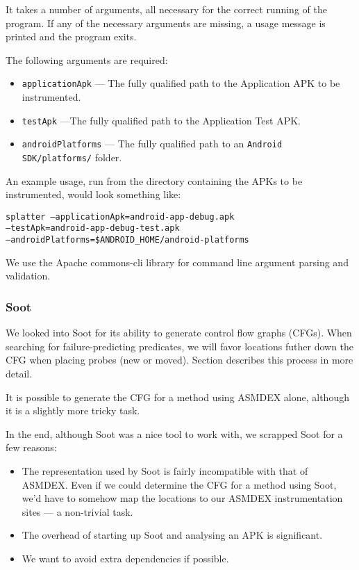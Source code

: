 It takes a number of arguments, all necessary for the correct running of the program. If any of the necessary arguments are missing, a usage message is printed and the program exits.

The following arguments are required:
\begin{itemize}
    \item \texttt{applicationApk} --- The fully qualified path to the Application APK to be instrumented.
    \item \texttt{testApk} ---The fully qualified path to the Application Test APK.
    \item \texttt{androidPlatforms} --- The fully qualified path to an \texttt{Android SDK/platforms/} folder.
\end{itemize}

An example usage, run from the directory containing the APKs to be instrumented, would look something like:

\texttt{splatter --applicationApk=android-app-debug.apk\\--testApk=android-app-debug-test.apk\\--androidPlatforms=\$ANDROID\_HOME/android-platforms}

We use the Apache commons-cli library for command line argument parsing and validation.

\subsubsection{Soot}

We looked into Soot for its ability to generate control flow graphs (CFGs). When searching for failure-predicting predicates, we will favor locations futher down the CFG when placing probes (new or moved). Section  describes this process in more detail.

It is possible to generate the CFG for a method using ASMDEX alone, although it is a slightly more tricky task.

In the end, although Soot was a nice tool to work with, we scrapped Soot for a few reasons:
\begin{itemize}
    \item The representation used by Soot is fairly incompatible with that of ASMDEX. Even if we could determine the CFG for a method using Soot, we'd have to somehow map the locations to our ASMDEX instrumentation sites --- a non-trivial task.
    \item The overhead of starting up Soot and analysing an APK is significant. 
    \item We want to avoid extra dependencies if possible.
\end{itemize}

